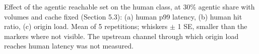 Effect of the agentic reachable set on the human class, at 30\% agentic share with volumes and cache fixed (Section 5.3): (a) human p99 latency, (b) human hit ratio, (c) origin load. Mean of 5 repetitions; whiskers $\pm$ 1 SE, smaller than the markers where not visible. The upstream channel through which origin load reaches human latency was not measured.
